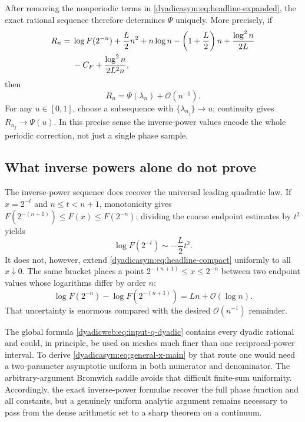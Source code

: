 \documentclass[11pt,oneside]{article}
\theoremstyle{definition}
\theoremstyle{remark}
\newcommand{\bigO}{\mathcal O}
\begin{document}
After removing the nonperiodic terms in \eqref{dyadicasym:eq:headline-expanded}, the exact rational
sequence therefore determines $\Psi$ uniquely.  More precisely, if
\begin{align}
 R_n={}&\log F(2^{-n})+\frac L2n^2+n\log n-
 \left(1+\frac L2\right)n+\frac{\log^2n}{2L}               \notag\\
 &-C_F+\frac{\log^2n}{2L^2n},                              \label{dyadicasym:eq:renormalized-Rn}
\end{align}
then
\begin{equation}
 R_n=\Psi(\lambda_n)+\bigO(n^{-1}).                         \label{dyadicasym:eq:Rn-Psi}
\end{equation}
For any $u\in[0,1]$, choose a subsequence with
$\{\lambda_{n_j}\}\to u$; continuity gives $R_{n_j}\to\Psi(u)$.  In this precise sense the
inverse-power values encode the whole periodic correction, not just a single phase sample.

\subsection{What inverse powers alone do not prove}

The inverse-power sequence does recover the universal leading quadratic law.  If
$x=2^{-t}$ and $n\le t<n+1$, monotonicity gives
$F(2^{-(n+1)})\le F(x)\le F(2^{-n})$; dividing the coarse endpoint estimates by
$t^2$ yields
\begin{equation}
 \log F(2^{-t})\sim-\frac L2t^2.
 \label{dyadicasym:eq:monotone-leading-law}
\end{equation}
It does not, however, extend \eqref{dyadicasym:eq:headline-compact} uniformly to all
$x\downarrow0$.  The same bracket places a point
$2^{-(n+1)}\le x\le2^{-n}$ between two endpoint values whose logarithms differ by order $n$:
\begin{equation}
 \log F(2^{-n})-\log F(2^{-(n+1)})=Ln+\bigO(\log n).        \label{dyadicasym:eq:dyadic-gap}
\end{equation}
That uncertainty is enormous compared with the desired $\bigO(n^{-1})$ remainder.

The global formula \eqref{dyadicweb:eq:input-q-dyadic} contains every dyadic rational and could, in principle,
be used on meshes much finer than one reciprocal-power interval.  To derive
\eqref{dyadicasym:eq:general-x-main} by that route one would need a two-parameter asymptotic uniform in
both numerator and denominator.  The arbitrary-argument Bromwich saddle avoids that difficult
finite-sum uniformity.  Accordingly, the exact inverse-power formulae recover the full phase
function and all constants, but a genuinely uniform analytic argument remains necessary to
pass from the dense arithmetic set to a sharp theorem on a continuum.
\end{document}
